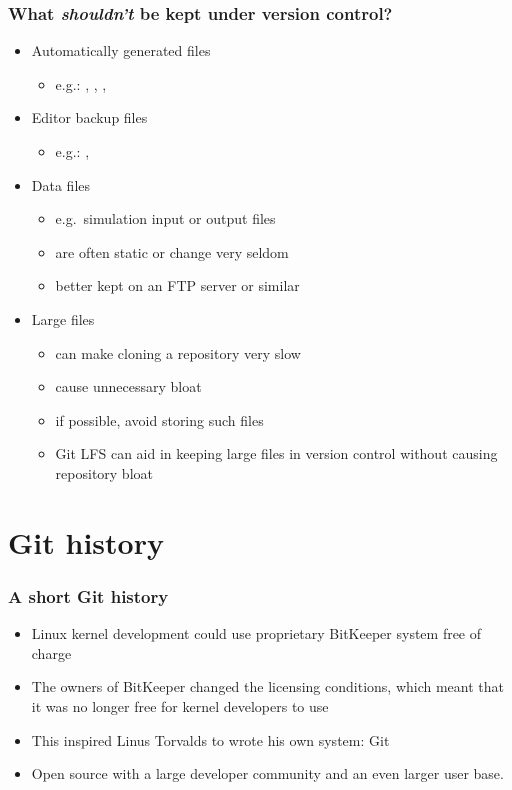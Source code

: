 \begin{frame}
\frametitle{What \emph{shouldn't} be kept under version control?}
\begin{itemize}
    \item Automatically generated files
        \begin{itemize}
            \item e.g.: , , , 
        \end{itemize}
    \item Editor backup files
        \begin{itemize}
            \item e.g.: , 
        \end{itemize}
    \item Data files
        \begin{itemize}
            \item e.g.\ simulation input or output files
            \item are often static or change very seldom
            \item better kept on an FTP server or similar
        \end{itemize}
    \item Large files
        \begin{itemize}
            \item can make cloning a repository very slow
            \item cause unnecessary bloat
            \item if possible, avoid storing such files
            \item Git LFS can aid in keeping large files in version
                control without causing repository bloat
        \end{itemize}
\end{itemize}
\end{frame}

\section{Git history}

\begin{frame}
\frametitle{A short Git history}
\begin{itemize}
    \item Linux kernel development could use proprietary BitKeeper system
        free of charge
    \item The owners of BitKeeper changed the licensing conditions, which
        meant that it was no longer free for kernel developers to use
    \item This inspired Linus Torvalds to wrote his own system: Git
    \item Open source with a large developer community and an even larger
        user base.
\end{itemize}
\end{frame}

